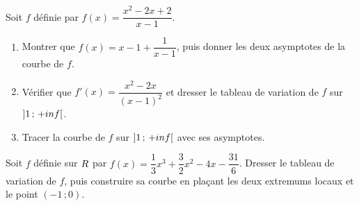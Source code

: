 \begin{annales}
Soit $f$ définie par $f(x) = \dfrac{x^{2}-2x+2}{x-1}$.
\begin{enumerate}[label=\textbf{\alph*)}, leftmargin=*, itemsep=0.15em]
  \item Montrer que $f(x) = x-1+\dfrac{1}{x-1}$, puis donner les deux
        asymptotes de la courbe de $f$.
  \item Vérifier que $f'(x) = \dfrac{x^{2}-2x}{(x-1)^{2}}$ et dresser le
        tableau de variation de $f$ sur $\left]1\,;\,+inf\right[$.
  \item Tracer la courbe de $f$ sur $\left]1\,;\,+inf\right[$ avec ses
        asymptotes.
\end{enumerate}

Soit $f$ définie sur $R$ par
$f(x) = \dfrac{1}{3}x^{3}+\dfrac{3}{2}x^{2}-4x-\dfrac{31}{6}$. Dresser le
tableau de variation de $f$, puis construire sa courbe en plaçant les deux
extremums locaux et le point $(-1\,;0)$.

\medskip
{}
\end{annales}

